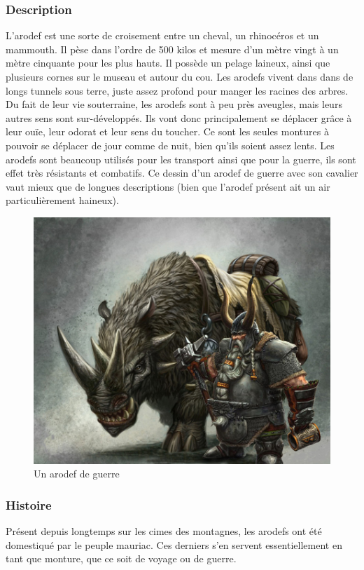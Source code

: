 \subsubsection{Description}
L’arodef est une sorte de croisement entre un cheval, un rhinocéros et un mammouth. Il pèse dans l’ordre de 500 kilos et mesure d’un mètre vingt à un mètre cinquante pour les plus hauts. Il possède un pelage laineux, ainsi que plusieurs cornes sur le museau et autour du cou. Les arodefs vivent dans dans de longs tunnels sous terre, juste assez profond pour manger les racines des arbres. Du fait de leur vie souterraine, les arodefs sont à peu près aveugles, mais leurs autres sens sont sur-développés. Ils vont donc principalement se déplacer grâce à leur ouïe, leur odorat et leur sens du toucher. Ce sont les seules montures à pouvoir se déplacer de jour comme de nuit, bien qu’ils soient assez lents. Les arodefs sont beaucoup utilisés pour les transport ainsi que pour la guerre, ils sont effet très résistants et combatifs. Ce dessin d’un arodef de guerre avec son cavalier vaut mieux que de longues descriptions (bien que l’arodef présent ait un air particulièrement haineux). 
\begin{figure}[ht]
\begin{center}
   \includegraphics[scale=1.2]{./Ressources/medieval/arodef.jpg}
   \caption{Un arodef de guerre}
\end{center}
\end{figure}
\subsubsection{Histoire}
Présent depuis longtemps sur les cimes des montagnes, les arodefs ont été domestiqué par le peuple mauriac. Ces derniers s’en servent essentiellement en tant que monture, que ce soit de voyage ou de guerre. 
